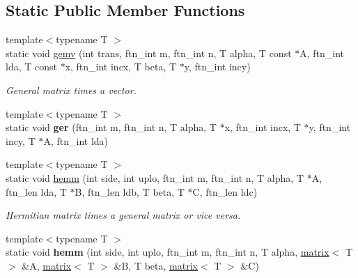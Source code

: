 \subsection*{Static Public Member Functions}
\begin{DoxyCompactItemize}
\item 
{\footnotesize template$<$typename T $>$ }\\static void \hyperlink{classsddk_1_1linalg_3_01_c_p_u_01_4_a548beaa4840e60963b161b73d868d601}{gemv} (int trans, ftn\+\_\+int m, ftn\+\_\+int n, T alpha, T const $\ast$A, ftn\+\_\+int lda, T const $\ast$x, ftn\+\_\+int incx, T beta, T $\ast$y, ftn\+\_\+int incy)
\begin{DoxyCompactList}\small\item\em General matrix times a vector. \end{DoxyCompactList}\item 
\hypertarget{classsddk_1_1linalg_3_01_c_p_u_01_4_a850140499d85fe2532e4296a0fe294a1}{}{\footnotesize template$<$typename T $>$ }\\static void {\bfseries ger} (ftn\+\_\+int m, ftn\+\_\+int n, T alpha, T $\ast$x, ftn\+\_\+int incx, T $\ast$y, ftn\+\_\+int incy, T $\ast$A, ftn\+\_\+int lda)\label{classsddk_1_1linalg_3_01_c_p_u_01_4_a850140499d85fe2532e4296a0fe294a1}

\item 
{\footnotesize template$<$typename T $>$ }\\static void \hyperlink{classsddk_1_1linalg_3_01_c_p_u_01_4_aa4bcbd88a686d98680c54a8529670ed0}{hemm} (int side, int uplo, ftn\+\_\+int m, ftn\+\_\+int n, T alpha, T $\ast$A, ftn\+\_\+len lda, T $\ast$B, ftn\+\_\+len ldb, T beta, T $\ast$C, ftn\+\_\+len ldc)
\begin{DoxyCompactList}\small\item\em Hermitian matrix times a general matrix or vice versa. \end{DoxyCompactList}\item 
\hypertarget{classsddk_1_1linalg_3_01_c_p_u_01_4_ad52298afff9d14f7c97ae443adafc40d}{}{\footnotesize template$<$typename T $>$ }\\static void {\bfseries hemm} (int side, int uplo, ftn\+\_\+int m, ftn\+\_\+int n, T alpha, \hyperlink{classsddk_1_1mdarray}{matrix}$<$ T $>$ \&A, \hyperlink{classsddk_1_1mdarray}{matrix}$<$ T $>$ \&B, T beta, \hyperlink{classsddk_1_1mdarray}{matrix}$<$ T $>$ \&C)\label{classsddk_1_1linalg_3_01_c_p_u_01_4_ad52298afff9d14f7c97ae443adafc40d}


\end{DoxyCompactItemize}
